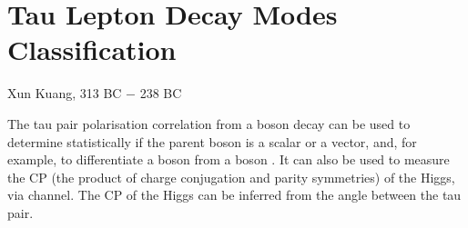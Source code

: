 \chapter{Tau Lepton Decay Modes Classification}
\label{chap:Tau}

%
{Xun Kuang, 313 BC $-$ 238 BC}%

The tau pair polarisation correlation from a boson decay can be used to determine statistically if the parent boson is a  scalar or a vector, and, for example, to differentiate a \PH boson from  a \PZ boson \cite{Bullock:1991my}. It can also be used to measure the CP (the product of charge conjugation and parity symmetries) of the Higgs, via \HiggsToTauTau channel\cite{Berge:2015nua}. The CP of the Higgs can be inferred from the angle between the tau pair.

